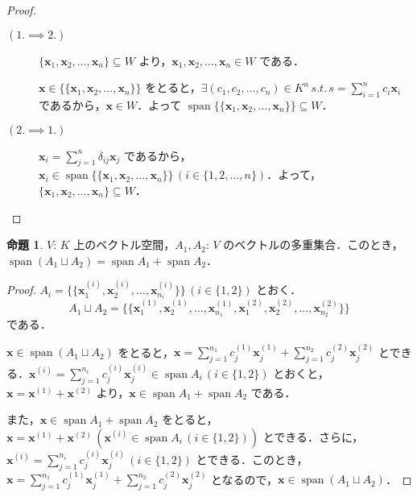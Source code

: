 \documentclass{jlreq}
\theoremstyle{definition}
\newtheorem{prop}[thm]{命題}
\DeclareMathOperator{\Span}{span}
\begin{document}
      \begin{proof}
        \mbox{}
        \begin{description}
          \item [$(1. \implies 2.) \, $]
            \mbox{}

            $\{\bm{x}_1, \bm{x}_2, \dots, \bm{x}_n\} \subseteq W$ より，$\bm{x}_1, \bm{x}_2, \dots, \bm{x}_n \in W$ である．

            $\bm{x} \in \{\{\bm{x}_1, \bm{x}_2, \dots, \bm{x}_n\}\}$ をとると，$\exists (c_1,c_2,\dots,c_n) \in K^n \, s.t. \, s=\sum_{i=1}^nc_i\bm{x}_i$ であるから，$\bm{x} \in W$．よって $\Span \{\{\bm{x}_1, \bm{x}_2, \dots, \bm{x}_n\}\} \subseteq W$．
          \item [$(2. \implies 1.) \, $]
            \mbox{}

            $\bm{x}_i=\sum_{j=1}^n\delta_{ij}\bm{x}_j$ であるから，$\bm{x}_i \in \Span\{\{\bm{x}_1, \bm{x}_2, \dots, \bm{x}_n\}\} \, (i \in \{1,2,\dots,n\})$．よって，$\{\bm{x}_1, \bm{x}_2, \dots, \bm{x}_n\} \subseteq W$．
        \end{description}
      \end{proof}
      \begin{prop}\label{span-of-sum-space}
        $V$: $K$ 上のベクトル空間，$A_1, A_2$: $V$ のベクトルの多重集合．このとき，$\Span (A_1 \sqcup A_2) = \Span A_1 + \Span A_2$．
      \end{prop}
      \begin{proof}
        $A_i=\{\{\bm{x}^{(i)}_1, \bm{x}^{(i)}_2, \dots, \bm{x}^{(i)}_{n_i}\}\} \, (i \in \{1,2\})$ とおく．$$A_1 \sqcup A_2 = \{\{\bm{x}^{(1)}_1, \bm{x}^{(1)}_2, \dots, \bm{x}^{(1)}_{n_1}, \bm{x}^{(2)}_1, \bm{x}^{(2)}_2, \dots, \bm{x}^{(2)}_{n_2}\}\}$$ である．

        $\bm{x} \in \Span(A_1 \sqcup A_2)$ をとると，$\bm{x}=\sum_{j=1}^{n_1}c_j^{(1)}\bm{x}^{(1)}_j+\sum_{j=1}^{n_2}c_j^{(2)}\bm{x}^{(2)}_j$ とできる．$\bm{x}^{(i)} = \sum_{j=1}^{n_i}c_j^{(i)}\bm{x}^{(i)}_j \in \Span A_i \, (i\in\{1,2\})$ とおくと，$\bm{x}=\bm{x}^{(1)}+\bm{x}^{(2)}$ より，$\bm{x} \in \Span A_1 + \Span A_2$ である．

        また，$\bm{x} \in \Span A_1 + \Span A_2$ をとると，$\bm{x}=\bm{x}^{(1)}+\bm{x}^{(2)} \, (\bm{x}^{(i)} \in \Span A_i \, (i \in \{1,2\}))$ とできる．さらに，$\bm{x}^{(i)} = \sum_{j=1}^{n_i}c_j^{(i)}\bm{x}^{(i)}_j \, (i \in \{1,2\})$ とできる．このとき，$\bm{x}=\sum_{j=1}^{n_1}c_j^{(1)}\bm{x}^{(1)}_j+\sum_{j=1}^{n_2}c_j^{(2)}\bm{x}^{(2)}_j$ となるので，$\bm{x} \in \Span(A_1 \sqcup A_2)$．
      \end{proof}
\end{document}
